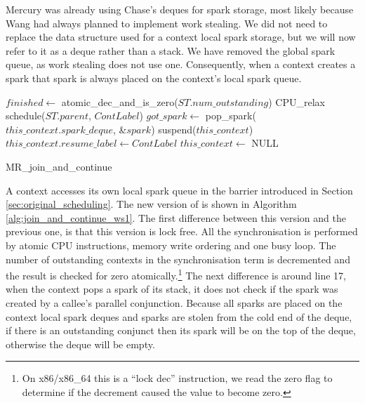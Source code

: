 Mercury was already using Chase's deques for spark storage,
most likely because Wang had always planned to implement work stealing.
We did not need to replace the data structure used for a context local
spark storage,
but we will now refer to it as a deque rather than a stack.
We have removed the global spark queue,
as work stealing does not use one.
Consequently,
when a context creates a spark that spark is always placed on the
context's local spark queue.

\begin{algorithm}
\begin{algorithmic}[1]
  \State $finished \gets$ atomic\_dec\_and\_is\_zero($ST.num\_outstanding$)
    \Else
        \State CPU\_relax
      \EndWhile
      \State schedule($ST.parent$, $ContLabel$)
    \EndIf
  \Else
    \State $got\_spark \gets$ pop\_spark($this\_context.spark\_deque$,
        \&$spark$)
    \Else
         \State suspend($this\_context$)
         \State $this\_context.resume\_label \gets ContLabel$
         \State $this\_context \gets$ NULL
      \EndIf
    \EndIf
  \EndIf
\EndProcedure
\end{algorithmic}
\caption{MR\_join\_and\_continue}
\label{alg:join_and_continue_ws1}
\end{algorithm}

A context accesses its own local spark queue in the \joinandcontinue barrier
introduced in Section \ref{sec:original_scheduling}.
The new version of \joinandcontinue is shown in Algorithm
\ref{alg:join_and_continue_ws1}.
The first difference between this version and the previous one,
is that this version is lock free.
All the synchronisation is performed by atomic CPU instructions, memory
write ordering and one busy loop.
The number of outstanding contexts in the synchronisation term is
decremented and the result is checked for zero atomically.\footnote{
    On x86/x86\_64 this is a ``lock dec'' instruction, we read the zero flag
    to determine if the decrement caused the value to become zero.}
The next difference is around line 17,
when the context pops a spark of its stack, it does not check if the spark
was created by a callee's parallel conjunction.
Because all sparks are placed on the context local spark deques and
sparks are stolen from the cold end of the deque,
if there is an outstanding conjunct then its spark will be on the top of the
deque,
otherwise the deque will be empty.

